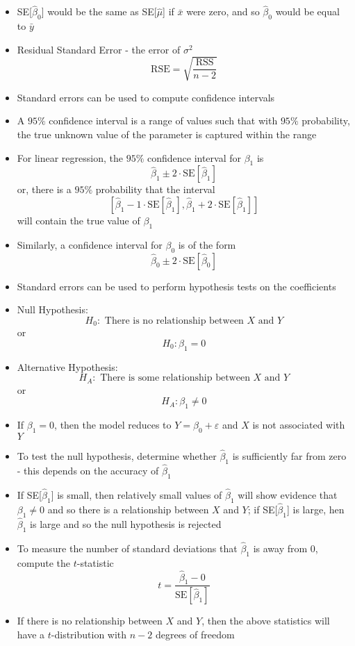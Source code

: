 \documentclass[12pt]{article}
\begin{document}
\begin{itemize}
\item SE[$\hat{\beta}_0$] would be the same as SE[$\hat{\mu}$] if $\bar{x}$ were zero, and so $\hat{\beta}_0$ would be equal to $\bar{y}$
\item Residual Standard Error - the error of $\sigma^2$ $$ \text{RSE} = \sqrt{\frac{\text{RSS}}{n-2}} $$ 
\item Standard errors can be used to compute confidence intervals 
\item A $95\%$ confidence interval is a range of values such that with $95\%$ probability, the true unknown value of the parameter is captured within the range 
\item For linear regression, the $95\%$ confidence interval for $\beta_1$ is $$ \hat{\beta}_1 \pm 2 \cdot \text{SE}[\hat{\beta}_1] $$ or, there is a $95\%$ probability that the interval $$ [\hat{\beta}_1 - 1\cdot \text{SE}[\hat{\beta}_1], \hat{\beta}_1 + 2\cdot \text{SE}[\hat{\beta}_1]] $$ will contain the true value of $\beta_1$
\item Similarly, a confidence interval for $\beta_0$ is of the form $$ \hat{\beta}_0 \pm 2 \cdot \text{SE}[\hat{\beta}_0] $$ 
\item Standard errors can be used to perform hypothesis tests on the coefficients 
\item Null Hypothesis: $$ H_0: \text{ There is no relationship between $X$ and $Y$} $$ or $$ H_0: \beta_1 = 0$$ 
\item Alternative Hypothesis: $$H_A: \text{ There is some relationship between $X$ and $Y$} $$ or $$H_A: \beta_1 \neq 0$$ 
\item If $\beta_1 = 0$, then the model reduces to $Y = \beta_0 + \varepsilon$ and $X$ is not associated with $Y$
\item To test the null hypothesis, determine whether $\hat{\beta}_1$ is sufficiently far from zero - this depends on the accuracy of $\hat{\beta}_1$
\item If SE[$\hat{\beta}_1$] is small, then relatively small values of $\hat{\beta}_1$ will show evidence that $\beta_1 \neq 0$ and so there is a relationship between $X$ and $Y$; if SE[$\hat{\beta}_1$] is large, hen $\hat{\beta}_1$ is large and so the null hypothesis is rejected 
\item To measure the number of standard deviations that $\hat{\beta}_1$ is away from $0$, compute the $t$-statistic $$ t = \frac{\hat{\beta}_1 - 0}{\text{SE}[\hat{\beta}_1]} $$ 
\item If there is no relationship between $X$ and $Y$, then the above statistics will have a $t$-distribution with $n-2$ degrees of freedom

\end{itemize}
\end{document}

